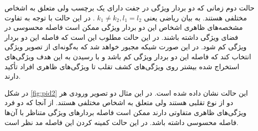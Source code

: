 حالت دوم زمانی که دو بردار ویژگی در جفت دارای یک برچسب ولی متعلق به اشخاص مختلفی هستند. به بیان ریاضی یعنی  
  $k_1 \ne k_2 , l_1 = l_2 $
. در این حالت با توجه به تفاوت مشخصه‌های ظاهری اشخاص این دو بردار ویژگی ممکن است فاصله محسوسی در فضای ویژگی داشته باشند. در این حالت مطلوب این است که فاصله این دو بردار ویژگی کم شود. در این صورت شبکه مجبور خواهد شد که به‌گونه‌ای از تصویر ویژگی انتخاب کند که فاصله این دو بردار ویژگی کم باشد و با رسیدن به این هدف ویژگی‌های استخراج شده بیشتر روی ویژگی‌های کشف تقلب تا ویژگی‌های ظاهری افراد تأکید دارند.

در شکل
\ref{fig:pid2}
این حالت نشان داده شده است. در این مثال دو تصویر ورودی هر دو از نوع تقلبی هستند ولی متعلق به اشخاص مختلفی هستند. از آنجا که دو فرد ویژگی‌های ظاهری متفاوتی دارند ممکن است فاصله بردارهای ویژگی متناظر با آن‌ها فاصله محسوسی داشته باشد. در این حالت کمینه کردن این فاصله مد نظر است. 
